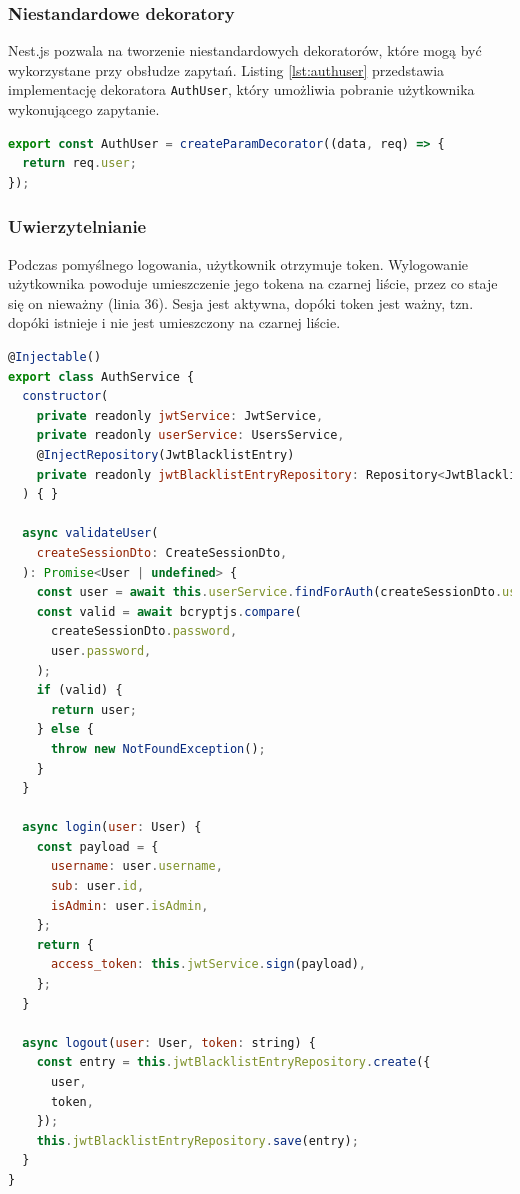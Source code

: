 
\subsubsection{Niestandardowe dekoratory}
Nest.js pozwala na tworzenie niestandardowych dekoratorów, które mogą być wykorzystane przy obsłudze zapytań. Listing \ref{lst:authuser} przedstawia implementację dekoratora \lstinline{AuthUser}, który umożliwia pobranie użytkownika wykonującego zapytanie.

\begin{lstlisting}[language=JavaScript, caption={Dekorator \lstinline{AuthUser}.}, label=lst:authuser]
export const AuthUser = createParamDecorator((data, req) => {
  return req.user;
});
\end{lstlisting}

\subsubsection{Uwierzytelnianie}
Podczas pomyślnego logowania, użytkownik otrzymuje token. Wylogowanie użytkownika powoduje umieszczenie jego tokena na czarnej liście, przez co staje się on nieważny (linia 36). Sesja jest aktywna, dopóki token jest ważny, tzn. dopóki istnieje i nie jest umieszczony na czarnej liście.

\begin{lstlisting}[language=JavaScript, caption={Serwis \lstinline{AuthService}.}, label=lst:auth_service]
@Injectable()
export class AuthService {
  constructor(
    private readonly jwtService: JwtService,
    private readonly userService: UsersService,
    @InjectRepository(JwtBlacklistEntry)
    private readonly jwtBlacklistEntryRepository: Repository<JwtBlacklistEntry>,
  ) { }

  async validateUser(
    createSessionDto: CreateSessionDto,
  ): Promise<User | undefined> {
    const user = await this.userService.findForAuth(createSessionDto.username);
    const valid = await bcryptjs.compare(
      createSessionDto.password,
      user.password,
    );
    if (valid) {
      return user;
    } else {
      throw new NotFoundException();
    }
  }

  async login(user: User) {
    const payload = {
      username: user.username,
      sub: user.id,
      isAdmin: user.isAdmin,
    };
    return {
      access_token: this.jwtService.sign(payload),
    };
  }

  async logout(user: User, token: string) {
    const entry = this.jwtBlacklistEntryRepository.create({
      user,
      token,
    });
    this.jwtBlacklistEntryRepository.save(entry);
  }
}
\end{lstlisting}

